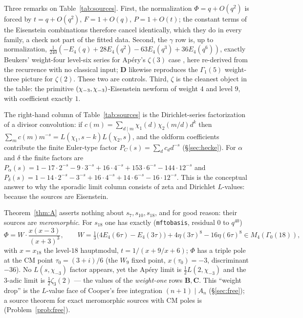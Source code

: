 Three remarks on Table~\ref{tab:sources}.  First, the normalization
$\Phi=q+O(q^2)$ is forced by $t=q+O(q^2)$, $F=1+O(q)$, $P=1+O(t)$; the constant
terms of the Eisenstein combinations therefore cancel identically, which they
do in every family, a check not part of the fitted data.  Second, the $\gamma$
row is, up to normalization,
$\tfrac1{240}(-E_4(q)+28E_4(q^2)-63E_4(q^3)+36E_4(q^6))$, exactly Beukers'
weight-four level-six series for Ap\'ery's $\zeta(3)$ case \cite{Beukers1987},
here re-derived from the recurrence with no classical input; $\mathbf D$
likewise reproduces the $\Gamma_1(5)$ weight-three picture for $\zeta(2)$.
These two are controls.  Third, $\zeta$ is the cleanest object in the table:
the primitive $(\chi_{-3},\chi_{-3})$-Eisenstein newform of weight $4$ and level $9$,
with coefficient exactly $1$.

\begin{remark}
The right-hand column of Table~\ref{tab:sources} is the Dirichlet-series
factorization of a divisor convolution: if
$c(m)=\sum_{d\mid m}\chi_1(d)\chi_2(m/d)d^{k}$ then
$\sum_mc(m)m^{-s}=L(\chi_1,s-k)L(\chi_2,s)$, and the oldform coefficients
contribute the finite Euler-type factor $P_C(s)=\sum_dc_dd^{-s}$
(\S\ref{sec:hecke}).  For $\alpha$ and $\delta$ the finite factors are
$P_\alpha(s)=1-17\cdot2^{-s}-9\cdot3^{-s}+16\cdot4^{-s}+153\cdot6^{-s}
-144\cdot12^{-s}$ and $P_\delta(s)=1-14\cdot2^{-s}-3^{-s}+16\cdot4^{-s}
+14\cdot6^{-s}-16\cdot12^{-s}$.  This is the conceptual answer to why the
sporadic limit column consists of zeta and Dirichlet $L$-values: because the
sources are Eisenstein.
\end{remark}

\begin{remark}\label{rem:cooper}
Theorem~\ref{thm:A} asserts nothing about $s_7,s_{10},s_{18}$, and for good
reason: their sources are \emph{meromorphic}.  For $s_{18}$ one has exactly
(\texttt{mftobasis}, residual $0$ to $q^{40}$)
\[
\Phi=W\cdot\frac{x(x-3)}{(x+3)^3},\qquad
W=\tfrac13\bigl(4E_4(6\tau)-E_4(3\tau)\bigr)+4\eta(3\tau)^8-16\eta(6\tau)^8\in M_4(\Gamma_0(18)),
\]
with $x=x_{18}$ the level-$18$ hauptmodul, $t=1/(x+9/x+6)$; $\Phi$ has a
triple pole at the CM point $\tau_0=(3+i)/6$ (the $W_9$ fixed point, $x(\tau_0)=-3$,
discriminant $-36$).  No $L(s,\chi_{-3})$ factor appears, yet the Ap\'ery limit is
$\tfrac12L(2,\chi_{-3})$  and the $3$-adic limit is
$\tfrac12\zeta_3(2)$  --- the values of the \emph{weight-one}
rows $\mathbf B,\mathbf C$.  This ``weight drop'' is the $L$-value face of
Cooper's free integration $(n+1)\mid A_n$ (\S\ref{sec:free}); a source theorem for
exact meromorphic sources with CM poles is \Open{} (Problem~\ref{prob:free}).
\end{remark}

